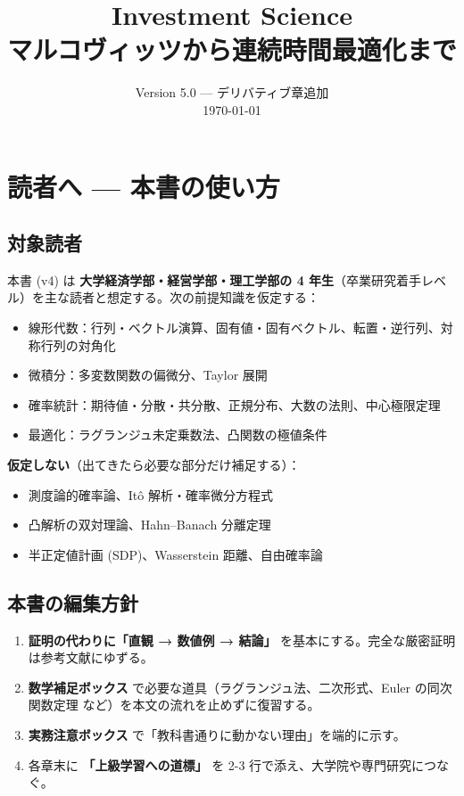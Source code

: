 \documentclass[11pt,a4paper]{report}
\title{Investment Science \\ \large マルコヴィッツから連続時間最適化まで}
\author{}
\date{Version 5.0 — デリバティブ章追加 \\ \today}
\begin{document}
\maketitle
\tableofcontents
\clearpage

\chapter{読者へ — 本書の使い方}

\section{対象読者}

本書 (v4) は \textbf{大学経済学部・経営学部・理工学部の 4 年生}（卒業研究着手レベル）を主な読者と想定する。次の前提知識を仮定する：

\begin{itemize}
\item 線形代数：行列・ベクトル演算、固有値・固有ベクトル、転置・逆行列、対称行列の対角化
\item 微積分：多変数関数の偏微分、Taylor 展開
\item 確率統計：期待値・分散・共分散、正規分布、大数の法則、中心極限定理
\item 最適化：ラグランジュ未定乗数法、凸関数の極値条件
\end{itemize}

\textbf{仮定しない}（出てきたら必要な部分だけ補足する）：
\begin{itemize}
\item 測度論的確率論、Itô 解析・確率微分方程式
\item 凸解析の双対理論、Hahn–Banach 分離定理
\item 半正定値計画 (SDP)、Wasserstein 距離、自由確率論
\end{itemize}

\section{本書の編集方針}

\begin{enumerate}
\item \textbf{証明の代わりに「直観 → 数値例 → 結論」} を基本にする。完全な厳密証明は参考文献にゆずる。
\item \textbf{数学補足ボックス} で必要な道具（ラグランジュ法、二次形式、Euler の同次関数定理 など）を本文の流れを止めずに復習する。
\item \textbf{実務注意ボックス} で「教科書通りに動かない理由」を端的に示す。
\item 各章末に \textbf{「上級学習への道標」} を 2-3 行で添え、大学院や専門研究につなぐ。
\end{enumerate}
\end{document}
